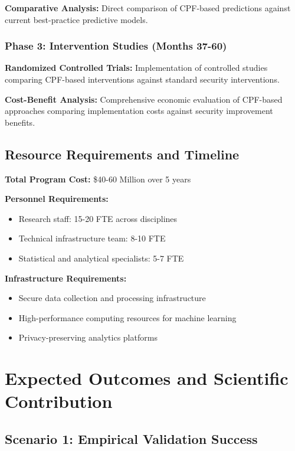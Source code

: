 \documentclass[11pt,a4paper]{article}
\begin{document}
\textbf{Comparative Analysis:} Direct comparison of CPF-based predictions against current best-practice predictive models.

\subsubsection{Phase 3: Intervention Studies (Months 37-60)}

\textbf{Randomized Controlled Trials:} Implementation of controlled studies comparing CPF-based interventions against standard security interventions.

\textbf{Cost-Benefit Analysis:} Comprehensive economic evaluation of CPF-based approaches comparing implementation costs against security improvement benefits.

\subsection{Resource Requirements and Timeline}

\textbf{Total Program Cost:} \$40-60 Million over 5 years

\textbf{Personnel Requirements:}
\begin{itemize}
\item Research staff: 15-20 FTE across disciplines
\item Technical infrastructure team: 8-10 FTE
\item Statistical and analytical specialists: 5-7 FTE
\end{itemize}

\textbf{Infrastructure Requirements:}
\begin{itemize}
\item Secure data collection and processing infrastructure
\item High-performance computing resources for machine learning
\item Privacy-preserving analytics platforms
\end{itemize}

\section{Expected Outcomes and Scientific Contribution}

\subsection{Scenario 1: Empirical Validation Success}
\end{document}
